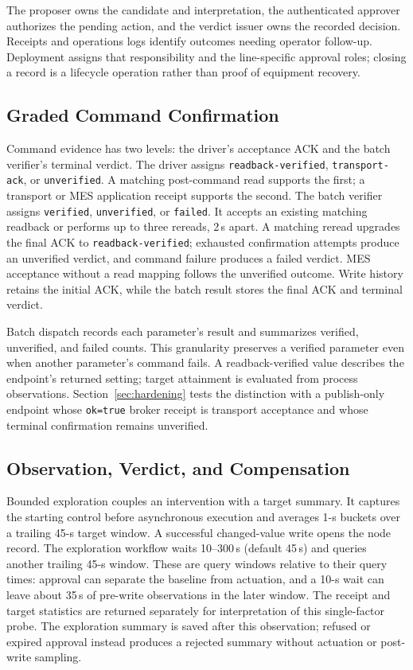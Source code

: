 The proposer owns the candidate and interpretation, the authenticated
approver authorizes the pending action, and the verdict issuer owns the
recorded decision. Receipts and operations logs identify outcomes needing
operator follow-up. Deployment assigns that responsibility and the
line-specific approval roles; closing a record is a lifecycle operation
rather than proof of equipment recovery.

\subsection{Graded Command Confirmation}
\label{sec:ack}
Command evidence has two levels: the driver's acceptance ACK and the batch
verifier's terminal verdict. The driver assigns
\texttt{readback-verified}, \texttt{transport-ack}, or
\texttt{unverified}. A matching post-command read supports the first;
a transport or MES application receipt supports the second. The batch
verifier assigns \texttt{verified}, \texttt{unverified}, or
\texttt{failed}. It accepts an existing matching readback or performs up to
three rereads, 2\,s apart. A matching reread upgrades the final ACK to
\texttt{readback-verified}; exhausted confirmation attempts produce an
unverified verdict, and command failure produces a failed verdict. MES
acceptance without a read mapping follows the unverified outcome. Write
history retains the initial ACK, while the batch result stores the final
ACK and terminal verdict.

Batch dispatch records each parameter's result and summarizes verified,
unverified, and failed counts. This granularity preserves a verified
parameter even when another parameter's command fails. A
readback-verified value describes the endpoint's returned setting; target
attainment is evaluated from process observations. Section~\ref{sec:hardening}
tests the distinction with a publish-only endpoint whose
\texttt{ok=true} broker receipt is transport acceptance and whose terminal
confirmation remains unverified.

\subsection{Observation, Verdict, and Compensation}
\label{sec:agentloop}
Bounded exploration couples an intervention with a target summary.
It captures the starting control before asynchronous execution and averages
1-s buckets over a trailing 45-s target window. A successful changed-value
write opens the node record. The exploration workflow waits
10--300\,s (default 45\,s) and queries another trailing 45-s window.
These are query windows relative to their query times: approval can
separate the baseline from actuation, and a 10-s wait can leave about 35\,s
of pre-write observations in the later window. The receipt and target
statistics are returned separately for interpretation of this single-factor
probe. The exploration summary is saved after this observation; refused or
expired approval instead produces a rejected summary without actuation or
post-write sampling.

